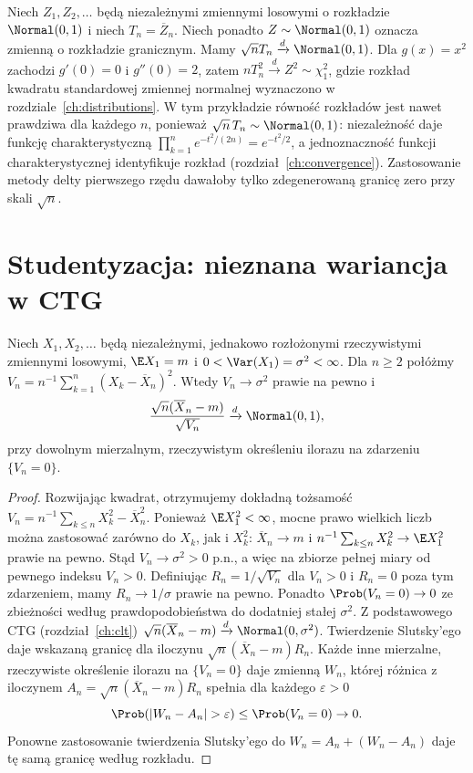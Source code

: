 \begin{przyklad}
Niech $Z_1,Z_2,\ldots$ będą niezależnymi zmiennymi
losowymi o rozkładzie $\Normal(0,1)$ i niech
$T_n=\overline Z_n$.
Niech ponadto $Z\sim\Normal(0,1)$ oznacza zmienną
o rozkładzie granicznym. Mamy $\sqrt n T_n\xrightarrow d \Normal(0,1)$.
Dla $g(x)=x^2$ zachodzi $g'(0)=0$
i $g''(0)=2$, zatem
$nT_n^2\xrightarrow d Z^2\sim\chi^2_1$,
gdzie rozkład kwadratu standardowej zmiennej normalnej
wyznaczono w rozdziale~\ref{ch:distributions}.
W tym przykładzie równość rozkładów jest nawet
prawdziwa dla każdego $n$, ponieważ
$\sqrt n\,T_n\sim \Normal(0,1)$: niezależność
daje funkcję charakterystyczną
$\prod_{k=1}^n e^{-t^2/(2n)}=e^{-t^2/2}$,
a jednoznaczność funkcji charakterystycznej
identyfikuje rozkład (rozdział~\ref{ch:convergence}).
Zastosowanie
metody delty pierwszego rzędu dawałoby tylko
zdegenerowaną granicę zero przy skali $\sqrt n$.
\end{przyklad}

\section{Studentyzacja: nieznana wariancja w CTG}

\begin{twierdzenie}
Niech $X_1,X_2,\ldots$ będą niezależnymi,
jednakowo rozłożonymi rzeczywistymi zmiennymi losowymi,
$\E X_1=m$ i $0<\Var(X_1)=\sigma^2<\infty$.
Dla $n\geq2$ połóżmy
$V_n=n^{-1}\sum_{k=1}^n(X_k-\overline X_n)^2$.
Wtedy $V_n\to\sigma^2$ prawie na pewno i
\[
\frac{\sqrt n(\overline X_n-m)}{\sqrt{V_n}}
\xrightarrow d\Normal(0,1),
\]
przy dowolnym mierzalnym, rzeczywistym określeniu ilorazu na zdarzeniu
$\{V_n=0\}$.
\end{twierdzenie}
\begin{proof}
Rozwijając kwadrat, otrzymujemy dokładną tożsamość
$V_n=n^{-1}\sum_{k\leq n}X_k^2-\overline X_n^2$.
Ponieważ $\E X_1^2<\infty$, mocne prawo wielkich
liczb można zastosować zarówno do $X_k$, jak i $X_k^2$:
$\overline X_n\to m$ i
$n^{-1}\sum_{k\leq n}X_k^2\to\E X_1^2$
prawie na pewno. Stąd $V_n\to\sigma^2>0$ p.n.,
a więc na zbiorze pełnej miary od pewnego indeksu
$V_n>0$. Definiując $R_n=1/\sqrt{V_n}$ dla $V_n>0$
i $R_n=0$ poza tym zdarzeniem, mamy
$R_n\to1/\sigma$ prawie na pewno.
Ponadto $\Prob(V_n=0)\to0$ ze zbieżności według
prawdopodobieństwa do dodatniej stałej $\sigma^2$.
Z podstawowego CTG (rozdział~\ref{ch:clt})
$\sqrt n(\overline X_n-m)\xrightarrow d \Normal(0,\sigma^2)$.
Twierdzenie Slutsky'ego daje wskazaną granicę dla
iloczynu $\sqrt n(\overline X_n-m)R_n$. Każde inne
mierzalne, rzeczywiste określenie ilorazu na
$\{V_n=0\}$ daje zmienną $W_n$, której różnica
z iloczynem $A_n=\sqrt n(\overline X_n-m)R_n$
spełnia dla każdego $\varepsilon>0$
\[
\Prob(|W_n-A_n|>\varepsilon)\leq\Prob(V_n=0)\to0.
\]
Ponowne zastosowanie twierdzenia Slutsky'ego do
$W_n=A_n+(W_n-A_n)$ daje tę samą granicę według rozkładu.
\end{proof}

